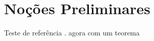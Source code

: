 
\chapter{Noções Preliminares}
    Teste de referência \cite{pessoa}. %
    agora com um teorema \cite[Teorema 4]{debora}
